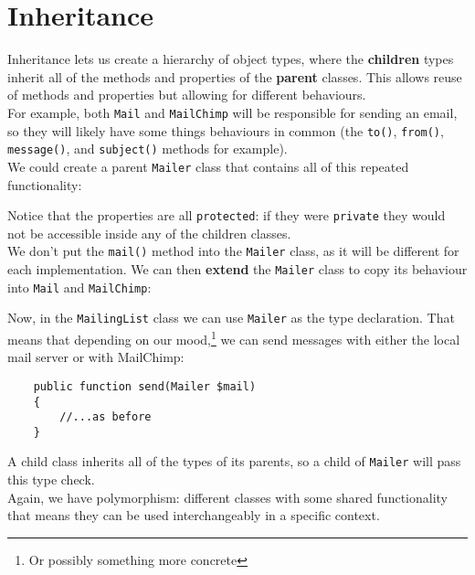 \section{Inheritance}

Inheritance lets us create a hierarchy of object types, where the \textbf{children} types inherit all of the methods and properties of the \textbf{parent} classes. This allows reuse of methods and properties but allowing for different behaviours.
\\

For example, both \texttt{Mail} and \texttt{MailChimp} will be responsible for sending an email, so they will likely have some things behaviours in common (the \texttt{to()}, \texttt{from()}, \texttt{message()}, and \texttt{subject()} methods for example).
\\

We could create a parent \texttt{Mailer} class that contains all of this repeated functionality:


Notice that the properties are all \texttt{protected}: if they were \texttt{private} they would not be accessible inside any of the children classes.
\\

We don't put the \texttt{mail()} method into the \texttt{Mailer} class, as it will be different for each implementation. We can then \textbf{extend} the \texttt{Mailer} class to copy its behaviour into \texttt{Mail} and \texttt{MailChimp}:


\pagebreak

Now, in the \texttt{MailingList} class we can use \texttt{Mailer} as the type declaration. That means that depending on our mood,\footnote{Or possibly something more concrete} we can send messages with either the local mail server or with MailChimp:

\begin{verbatim}
    public function send(Mailer $mail)
    {
        //...as before
    }
\end{verbatim}

A child class inherits all of the types of its parents, so a child of \texttt{Mailer} will pass this type check.
\\

Again, we have polymorphism: different classes with some shared functionality that means they can be used interchangeably in a specific context.


